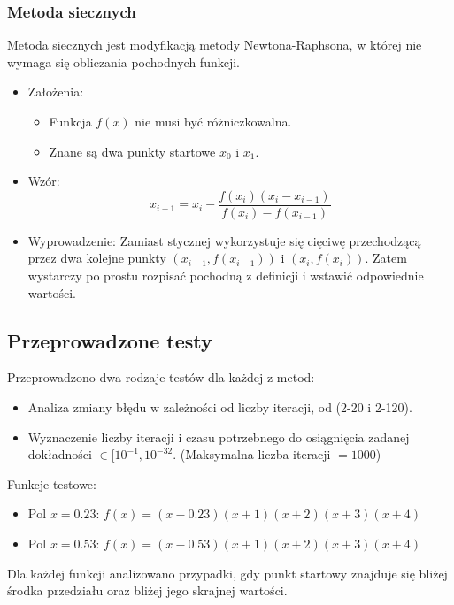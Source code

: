 \subsubsection{Metoda siecznych}
Metoda siecznych jest modyfikacją metody Newtona-Raphsona, w której nie wymaga się obliczania pochodnych funkcji.

\begin{itemize}
    \item Założenia:
    \begin{itemize}
        \item Funkcja \( f(x) \) nie musi być różniczkowalna.
        \item Znane są dwa punkty startowe \( x_0 \) i \( x_1 \).
    \end{itemize}
    \item Wzór:
    \[ x_{i+1} = x_i - \frac{f(x_i)(x_i - x_{i-1})}{f(x_i) - f(x_{i-1})} \]
    \item Wyprowadzenie:
    Zamiast stycznej wykorzystuje się cięciwę przechodzącą przez dwa kolejne punkty \((x_{i-1}, f(x_{i-1}))\) i \((x_i, f(x_i))\). Zatem wystarczy po prostu rozpisać pochodną z definicji i wstawić odpowiednie wartości.
\end{itemize}

\subsection{Przeprowadzone testy}
Przeprowadzono dwa rodzaje testów dla każdej z metod:

\begin{itemize}
    \item Analiza zmiany błędu w zależności od liczby iteracji, od (2-20 i 2-120). 
    \item Wyznaczenie liczby iteracji i czasu potrzebnego do osiągnięcia zadanej dokładności \(\in [10^{-1}, 10^{-32}\). (Maksymalna liczba iteracji $=1000$) 
\end{itemize}

Funkcje testowe:\
\begin{itemize}
    \item \( \text{Pol } x=0.23 \): \( f(x) = (x - 0.23)(x + 1)(x + 2)(x + 3)(x + 4) \)
    \item \( \text{Pol } x=0.53 \): \( f(x) = (x - 0.53)(x + 1)(x + 2)(x + 3)(x + 4) \)
\end{itemize}
Dla każdej funkcji analizowano przypadki, gdy punkt startowy znajduje się bliżej środka przedziału oraz bliżej jego skrajnej wartości.

